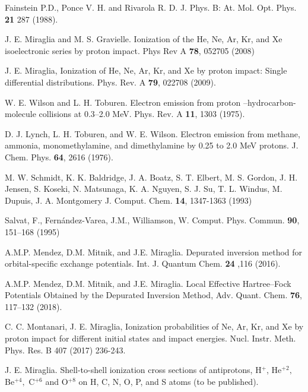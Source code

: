 \documentclass[preprint,showpacs]{revtex4}
\begin{document}
\begin{thebibliography}{99}

Fainstein P.D., Ponce V. H. and Rivarola R. D. 
J. Phys. B: At. Mol. Opt. Phys. \textbf{21} 287 (1988).

J. E. Miraglia and M. S. Gravielle. Ionization of the
He, Ne, Ar, Kr, and Xe isoelectronic series by proton impact. 
Phys Rev A \textbf{78}, 052705 (2008)

J. E. Miraglia, Ionization of He, Ne, Ar, Kr, and Xe
by proton impact: Single differential distributions. 
Phys. Rev. A \textbf{79}, 022708 (2009).

W. E. Wilson and L. H. Toburen. Electron emission from
proton --hydrocarbon-molecule collisions at 0.3--2.0 MeV. 
Phys. Rev. A \textbf{11}, 1303 (1975).

D. J. Lynch, L. H. Toburen, and W. E. Wilson. Electron
emission from methane, ammonia, monomethylamine, and dimethylamine by 0.25
to 2.0 MeV protons. 
J. Chem. Phys. \textbf{64}, 2616 (1976).

M. W. Schmidt, K. K. Baldridge, J. A. Boatz, S. T. Elbert, M. S. Gordon, 
J. H. Jensen, S. Koseki, N. Matsunaga, K. A. Nguyen, S. J. Su, T. L. Windus, 
M. Dupuis, J. A. Montgomery 
J. Comput. Chem. \textbf{14}, 1347-1363 (1993)


Salvat, F., Fern\'andez-Varea, J.M., Williamson, W.
Comput. Phys. Commun. \textbf{90}, 151--168 (1995)

A.M.P. Mendez, D.M. Mitnik, and J.E. Miraglia.
Depurated inversion method for orbital-specific exchange potentials. 
Int. J. Quantum Chem. \textbf{24} ,116 (2016).

A.M.P. Mendez, D.M. Mitnik, and J.E. Miraglia. 
Local Effective Hartree--Fock Potentials Obtained by the Depurated 
Inversion Method,
Adv. Quant. Chem. \textbf{76}, 117--132 (2018).

C. C. Montanari, J. E. Miraglia,
Ionization probabilities of Ne, Ar, Kr, and Xe by
proton impact for different initial states and impact energies. 
Nucl. Instr. Meth. Phys. Res. B 407 (2017) 236-243.

J. E. Miraglia. Shell-to-shell ionization cross
sections of antiprotons, H$^{+}$, He$^{+2},$ Be$^{+4},$ C$^{+6}$ and 
O$^{+8}$ on H, C, N, O, P, and S atoms (to be published).



\end{thebibliography}
\end{document}
